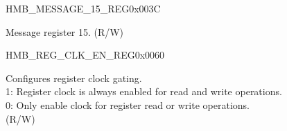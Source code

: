 \begin{register}{H}{MB\_MESSAGE\_15\_REG}{0x003C}\label{regdesc:MBMESSAGE15REG}
%
\regnewline%
\begin{regdesc}\begin{reglist}
\label{fielddesc:MBMESSAGE15}\item [MB\_MESSAGE\_15] Message register 15. (R/W)
\end{reglist}\end{regdesc}
\end{register}


\begin{register}{H}{MB\_REG\_CLK\_EN\_REG}{0x0060}\label{regdesc:MBREGCLKENREG}
%
%
\regnewline%
\begin{regdesc}\begin{reglist}
\label{fielddesc:MBREGCLKEN}\item [MB\_REG\_CLK\_EN] Configures register clock gating.\\
1: Register clock is always enabled for read and write operations.\\
0: Only enable clock for register read or write operations. \\(R/W)
\end{reglist}\end{regdesc}
\end{register}


